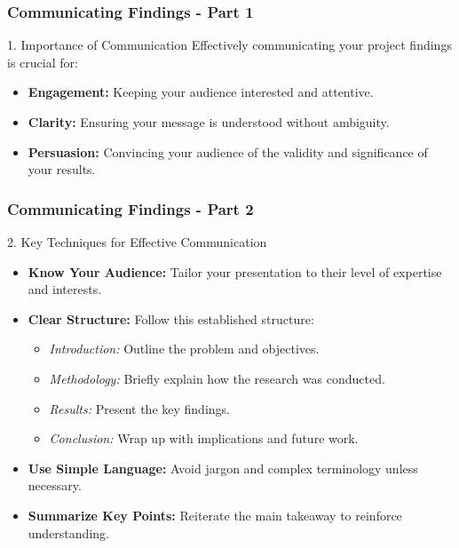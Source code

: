 \documentclass[aspectratio=169]{beamer}
\begin{document}
\begin{frame}[fragile]
    \frametitle{Communicating Findings - Part 1}
    \begin{block}{1. Importance of Communication}
        Effectively communicating your project findings is crucial for:
    \end{block}
    \begin{itemize}
        \item \textbf{Engagement:} Keeping your audience interested and attentive.
        \item \textbf{Clarity:} Ensuring your message is understood without ambiguity.
        \item \textbf{Persuasion:} Convincing your audience of the validity and significance of your results.
    \end{itemize}
\end{frame}

\begin{frame}[fragile]
    \frametitle{Communicating Findings - Part 2}
    \begin{block}{2. Key Techniques for Effective Communication}
        \begin{itemize}
            \item \textbf{Know Your Audience:} Tailor your presentation to their level of expertise and interests.
            \item \textbf{Clear Structure:} Follow this established structure:
            \begin{itemize}
                \item \textit{Introduction:} Outline the problem and objectives.
                \item \textit{Methodology:} Briefly explain how the research was conducted.
                \item \textit{Results:} Present the key findings.
                \item \textit{Conclusion:} Wrap up with implications and future work.
            \end{itemize}
            \item \textbf{Use Simple Language:} Avoid jargon and complex terminology unless necessary.
            \item \textbf{Summarize Key Points:} Reiterate the main takeaway to reinforce understanding.
        \end{itemize}
    \end{block}
\end{frame}
\end{document}
